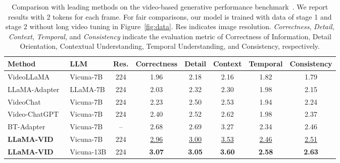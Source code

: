 \begin{table*}[t!]
 \centering
\begin{tabular}{llc|ccccc}
  \toprule
  Method & LLM & Res. & {\bf Correctness} & {\bf Detail} & {\bf Context} & {\bf Temporal} & {\bf Consistency} \\
  \midrule
  VideoLLaMA~\cite{videollama} & Vicuna-7B & 224 & 1.96 & 2.18 & 2.16 & 1.82 & 1.79 \\
  LLaMA-Adapter~\cite{llamaadapter} & LLaMA-7B & 224 & 2.03 & 2.32 & 2.30 & 1.98 & 2.15 \\
  VideoChat~\cite{videochat} & Vicuna-7B & 224 & 2.23 & 2.50 & 2.53 & 1.94 & 2.24 \\
  Video-ChatGPT~\cite{videochatgpt} & Vicuna-7B & 224 & 2.40 & 2.52 & 2.62 & 1.98 & 2.37 \\
  BT-Adapter~\cite{btadapter} & Vicuna-7B & -- & 2.68 & 2.69 & 3.27 & 2.34 & 2.46 \\
  \midrule
  \rowcolor{mygray}
  {\bf LLaMA-VID} & Vicuna-7B & 224 & \underline{2.96} & \underline{3.00} & \underline{3.53} & \underline{2.46} & \underline{2.51} \\
  \rowcolor{mygray}
  {\bf LLaMA-VID} & Vicuna-13B & 224 & {\bf 3.07} & {\bf 3.05} & {\bf 3.60} & {\bf 2.58} & {\bf 2.63} \\
  \bottomrule
\end{tabular}
 
 \caption{Comparison with leading methods on the video-based generative performance benchmark~\cite{videochatgpt}.
We report results with 2 tokens for each frame.
For fair comparisons, our model is trained with data of stage 1 and stage 2 without long video tuning in Figure~\ref{fig:data}.
Res indicates image resolution.
{\em Correctness}, {\em Detail}, {\em Context}, {\em Temporal}, and {\em Consistency} indicate the evaluation metric of Correctness of Information, Detail Orientation, Contextual Understanding, Temporal Understanding, and Consistency, respectively.
 }
 \label{tab:main_video_gen}
\end{table*}

